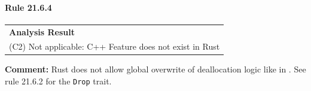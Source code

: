 \paragraph{Rule 21.6.4}
\begin{longtable}{p{13cm}}
\textbf{Analysis Result} \\
(C2) Not applicable: C++ Feature does not exist in Rust \\
\end{longtable}
\textbf{Comment:} Rust does not allow global overwrite of deallocation logic like in \Cpp. See rule 21.6.2 for the \texttt{Drop} trait. \\


